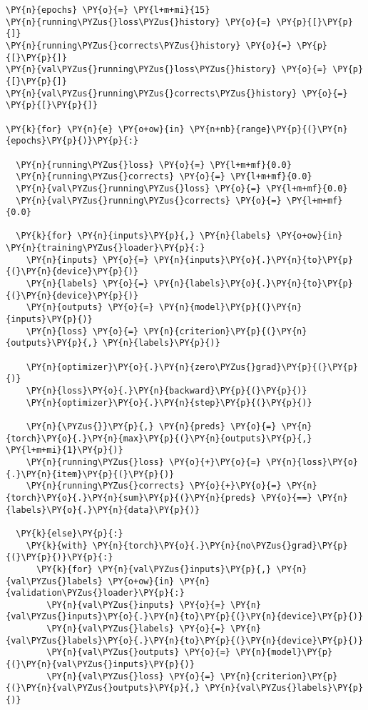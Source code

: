     \begin{tcolorbox}[breakable, size=fbox, boxrule=1pt, pad at break*=1mm,colback=cellbackground, colframe=cellborder]
\begin{Verbatim}[commandchars=\\\{\}]
\PY{n}{epochs} \PY{o}{=} \PY{l+m+mi}{15}
\PY{n}{running\PYZus{}loss\PYZus{}history} \PY{o}{=} \PY{p}{[}\PY{p}{]}
\PY{n}{running\PYZus{}corrects\PYZus{}history} \PY{o}{=} \PY{p}{[}\PY{p}{]}
\PY{n}{val\PYZus{}running\PYZus{}loss\PYZus{}history} \PY{o}{=} \PY{p}{[}\PY{p}{]}
\PY{n}{val\PYZus{}running\PYZus{}corrects\PYZus{}history} \PY{o}{=} \PY{p}{[}\PY{p}{]}

\PY{k}{for} \PY{n}{e} \PY{o+ow}{in} \PY{n+nb}{range}\PY{p}{(}\PY{n}{epochs}\PY{p}{)}\PY{p}{:}
  
  \PY{n}{running\PYZus{}loss} \PY{o}{=} \PY{l+m+mf}{0.0}
  \PY{n}{running\PYZus{}corrects} \PY{o}{=} \PY{l+m+mf}{0.0}
  \PY{n}{val\PYZus{}running\PYZus{}loss} \PY{o}{=} \PY{l+m+mf}{0.0}
  \PY{n}{val\PYZus{}running\PYZus{}corrects} \PY{o}{=} \PY{l+m+mf}{0.0}
  
  \PY{k}{for} \PY{n}{inputs}\PY{p}{,} \PY{n}{labels} \PY{o+ow}{in} \PY{n}{training\PYZus{}loader}\PY{p}{:}
    \PY{n}{inputs} \PY{o}{=} \PY{n}{inputs}\PY{o}{.}\PY{n}{to}\PY{p}{(}\PY{n}{device}\PY{p}{)}
    \PY{n}{labels} \PY{o}{=} \PY{n}{labels}\PY{o}{.}\PY{n}{to}\PY{p}{(}\PY{n}{device}\PY{p}{)}
    \PY{n}{outputs} \PY{o}{=} \PY{n}{model}\PY{p}{(}\PY{n}{inputs}\PY{p}{)}
    \PY{n}{loss} \PY{o}{=} \PY{n}{criterion}\PY{p}{(}\PY{n}{outputs}\PY{p}{,} \PY{n}{labels}\PY{p}{)}
    
    \PY{n}{optimizer}\PY{o}{.}\PY{n}{zero\PYZus{}grad}\PY{p}{(}\PY{p}{)}
    \PY{n}{loss}\PY{o}{.}\PY{n}{backward}\PY{p}{(}\PY{p}{)}
    \PY{n}{optimizer}\PY{o}{.}\PY{n}{step}\PY{p}{(}\PY{p}{)}
    
    \PY{n}{\PYZus{}}\PY{p}{,} \PY{n}{preds} \PY{o}{=} \PY{n}{torch}\PY{o}{.}\PY{n}{max}\PY{p}{(}\PY{n}{outputs}\PY{p}{,} \PY{l+m+mi}{1}\PY{p}{)}
    \PY{n}{running\PYZus{}loss} \PY{o}{+}\PY{o}{=} \PY{n}{loss}\PY{o}{.}\PY{n}{item}\PY{p}{(}\PY{p}{)}
    \PY{n}{running\PYZus{}corrects} \PY{o}{+}\PY{o}{=} \PY{n}{torch}\PY{o}{.}\PY{n}{sum}\PY{p}{(}\PY{n}{preds} \PY{o}{==} \PY{n}{labels}\PY{o}{.}\PY{n}{data}\PY{p}{)}

  \PY{k}{else}\PY{p}{:}
    \PY{k}{with} \PY{n}{torch}\PY{o}{.}\PY{n}{no\PYZus{}grad}\PY{p}{(}\PY{p}{)}\PY{p}{:}
      \PY{k}{for} \PY{n}{val\PYZus{}inputs}\PY{p}{,} \PY{n}{val\PYZus{}labels} \PY{o+ow}{in} \PY{n}{validation\PYZus{}loader}\PY{p}{:}
        \PY{n}{val\PYZus{}inputs} \PY{o}{=} \PY{n}{val\PYZus{}inputs}\PY{o}{.}\PY{n}{to}\PY{p}{(}\PY{n}{device}\PY{p}{)}
        \PY{n}{val\PYZus{}labels} \PY{o}{=} \PY{n}{val\PYZus{}labels}\PY{o}{.}\PY{n}{to}\PY{p}{(}\PY{n}{device}\PY{p}{)}
        \PY{n}{val\PYZus{}outputs} \PY{o}{=} \PY{n}{model}\PY{p}{(}\PY{n}{val\PYZus{}inputs}\PY{p}{)}
        \PY{n}{val\PYZus{}loss} \PY{o}{=} \PY{n}{criterion}\PY{p}{(}\PY{n}{val\PYZus{}outputs}\PY{p}{,} \PY{n}{val\PYZus{}labels}\PY{p}{)}
        

\end{Verbatim}
\end{tcolorbox}
